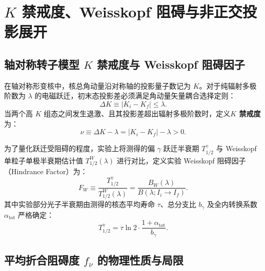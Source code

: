 \section{$K$ 禁戒度、Weisskopf 阻碍与非正交投影展开}\label{sec:appD-k-forbidden}

\subsection{轴对称转子模型 $K$ 禁戒度与 Weisskopf 阻碍因子}

在轴对称形变核中，核总角动量沿对称轴的投影量子数记为 $K$。对于纯辐射多极阶数为 $\lambda$ 的电磁跃迁，初末态投影差必须满足角动量矢量耦合选择定则：
\begin{equation}\label{eq:appD-k-selection-rule}
\Delta K \equiv |K_i - K_f| \le \lambda.
\end{equation}
当两个高 $K$ 组态之间发生退激、且其投影差超出辐射多极阶数时，定义\textbf{$K$ 禁戒度}为：
\begin{equation}\label{eq:appD-k-forbiddenness-nu}
\nu \equiv \Delta K - \lambda = |K_i - K_f| - \lambda > 0.
\end{equation}

为了量化跃迁受阻碍的程度，实验上将测得的偏 $\gamma$ 跃迁半衰期 $T_{1/2}^\gamma$ 与 Weisskopf 单粒子单极半衰期估计值 $T_{1/2}^W(\lambda)$ 进行对比，定义实验 Weisskopf 阻碍因子（Hindrance Factor）为：
\begin{equation}\label{eq:appD-hindrance-factor}
F_W \equiv \frac{T_{1/2}^\gamma}{T_{1/2}^W(\lambda)} = \frac{B_W(\lambda)}{B(\lambda; I_i \to I_f)}.
\end{equation}
其中实验部分光子半衰期由测得的核态平均寿命 $\tau$、总分支比 $b_\gamma$ 及全内转换系数 $\alpha_{\mathrm{tot}}$ 严格确定：
\begin{equation}\label{eq:appD-t12-gamma}
T_{1/2}^\gamma = \tau \ln 2 \cdot \frac{1 + \alpha_{\mathrm{tot}}}{b_\gamma}.
\end{equation}

\subsection{平均折合阻碍度 $f_\nu$ 的物理性质与局限}

